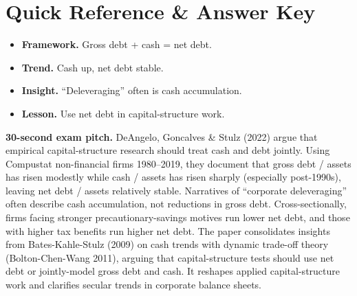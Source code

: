 \documentclass[11pt]{article}
\begin{document}
\section*{Quick Reference \& Answer Key}
\begin{answerbox}
\begin{itemize}
\item \textbf{Framework.} Gross debt + cash = net debt.
\item \textbf{Trend.} Cash up, net debt stable.
\item \textbf{Insight.} ``Deleveraging'' often is cash accumulation.
\item \textbf{Lesson.} Use net debt in capital-structure work.
\end{itemize}
\end{answerbox}

\begin{keybox}
\textbf{30-second exam pitch.} DeAngelo, Goncalves \& Stulz (2022) argue that empirical capital-structure research should treat cash and debt jointly. Using Compustat non-financial firms 1980--2019, they document that gross debt / assets has risen modestly while cash / assets has risen sharply (especially post-1990s), leaving net debt / assets relatively stable. Narratives of ``corporate deleveraging'' often describe cash accumulation, not reductions in gross debt. Cross-sectionally, firms facing stronger precautionary-savings motives run lower net debt, and those with higher tax benefits run higher net debt. The paper consolidates insights from Bates-Kahle-Stulz (2009) on cash trends with dynamic trade-off theory (Bolton-Chen-Wang 2011), arguing that capital-structure tests should use net debt or jointly-model gross debt and cash. It reshapes applied capital-structure work and clarifies secular trends in corporate balance sheets.
\end{keybox}
\end{document}
